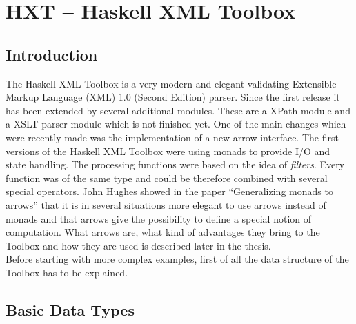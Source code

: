 \documentclass[11pt,a4paper,headsepline, bibtotoc]{scrreprt}
\begin{document}
\chapter{HXT -- Haskell XML Toolbox}
\section{Introduction}

The Haskell XML Toolbox is a very modern and elegant validating Extensible Markup Language (XML) 1.0 (Second Edition) \cite{XML} parser. Since the first release it has been extended by several additional modules. These are a XPath module and a XSLT parser module which is not finished yet. One of the main changes which were recently made was the implementation of a new arrow interface. The first versions of the Haskell XML Toolbox were using monads to provide I/O and state handling. The processing functions were based on the idea of \textit{filters}. Every function was of the same type and could be therefore combined with several special operators. John Hughes showed in the paper ``Generalizing monads to arrows'' \cite{H:2000} that it is in several situations more elegant to use arrows instead of monads and that arrows give the possibility to define a special notion of computation. What arrows are, what kind of advantages they bring to the Toolbox and how they are used is described later in the thesis.\\
Before starting with more complex examples, first of all the data structure of the Toolbox has to be explained.
\section{Basic Data Types}
\end{document}
